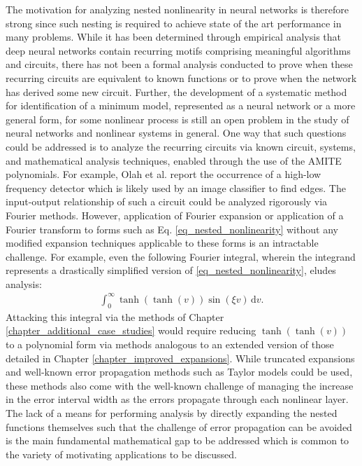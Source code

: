 The motivation for analyzing nested nonlinearity in neural networks is therefore strong since such nesting is required to achieve state of the art performance in many problems.  While it has been determined through empirical analysis that deep neural networks contain recurring motifs comprising meaningful algorithms and circuits, there has not been a formal analysis conducted to prove when these recurring circuits are equivalent to known functions or to prove when the network has derived some new circuit.  Further, the development of a systematic method for identification of a minimum model, represented as a neural network or a more general form, for some nonlinear process is still an open problem in the study of neural networks and nonlinear systems in general.  One way that such questions could be addressed is to analyze the recurring circuits via known circuit, systems, and mathematical analysis techniques, enabled through the use of the AMITE polynomials.  For example, Olah et al. report the occurrence of a high-low frequency detector which is likely used by an image classifier to find edges.  The input-output relationship of such a circuit could be analyzed rigorously via Fourier methods.  However, application of Fourier expansion or application of a Fourier transform to forms such as Eq. \ref{eq_nested_nonlinearity} without any modified expansion techniques applicable to these forms is an intractable challenge.  For example, even the following Fourier integral, wherein the integrand represents a drastically simplified version of \ref{eq_nested_nonlinearity}, eludes analysis:
\begin{align}
	\int_{0}^{\infty} \! 
	    \tanh(\tanh(v)) \sin(\xi v)
	\, \mathrm{d} v .
\end{align}
Attacking this integral via the methods of Chapter \ref{chapter_additional_case_studies} would require reducing $\tanh(\tanh(v))$ to a polynomial form via methods analogous to an extended version of those detailed in Chapter \ref{chapter_improved_expansions}.  While truncated expansions and well-known error propagation methods such as Taylor models could be used, these methods also come with the well-known challenge of managing the increase in the error interval width as the errors propagate through each nonlinear layer.  The lack of a means for performing analysis by directly expanding the nested functions themselves such that the challenge of error propagation can be avoided is the main fundamental mathematical gap to be addressed which is common to the variety of motivating applications to be discussed.

